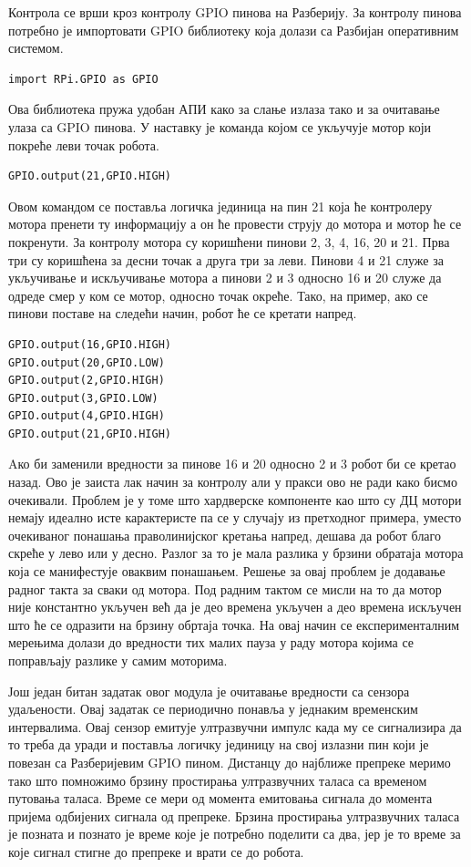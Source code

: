 \documentclass[12pt,oneside]{memoir}
\theoremstyle{remark}
\begin{document}
Контрола се врши кроз контролу GPIO пинова на Разберију. За контролу пинова потребно је импортовати GPIO библиотеку која долази са Разбијан оперативним системом.
\begin{lstlisting}
import RPi.GPIO as GPIO
\end{lstlisting}
Ова библиотека пружа удобан АПИ како за слање излаза тако и за очитавање улаза са GPIO пинова. У наставку је команда којом се укључује мотор који покреће леви точак робота.
\begin{lstlisting}
GPIO.output(21,GPIO.HIGH)
\end{lstlisting}

Овом командом се поставља логичка јединица на пин 21 која ће контролеру мотора пренети ту информацију а он ће провести струју до мотора и мотор ће се покренути.
За контролу мотора су коришћени пинови 2, 3, 4, 16, 20 и 21. Прва три су коришћена за десни точак а друга три за леви. Пинови 4 и 21 служе за укључивање и искључивање мотора а пинови 2 и 3 односно  16 и 20 служе да одреде смер у ком се мотор, односно точак окреће. Тако, на пример, ако се пинови поставе на следећи начин, робот ће се кретати напред.
\begin{lstlisting}
GPIO.output(16,GPIO.HIGH)
GPIO.output(20,GPIO.LOW)
GPIO.output(2,GPIO.HIGH)
GPIO.output(3,GPIO.LOW)
GPIO.output(4,GPIO.HIGH)
GPIO.output(21,GPIO.HIGH)
\end{lstlisting}

Aко би заменили вредности за пинове 16 и 20 односно 2 и 3 робот би се кретао назад. Ово је заиста лак начин за контролу али у пракси ово не ради како бисмо очекивали. Проблем је у томе што хардверске компоненте као што су ДЦ мотори немају идеално исте карактеристе па се у случају из претходног примера, уместо очекиваног понашања праволинијског кретања напред, дешава да робот благо скреће у лево или у десно. Разлог за то је мала разлика у брзини обратаја мотора која се манифестује оваквим понашањем. Решење за овај проблем је додавање радног такта за сваки од мотора. Под радним тактом се мисли на то да мотор није константно укључен већ да је део времена укључен а део времена искључен што ће се одразити на брзину обртаја точка. На овај начин се експерименталним мерењима долази до вредности тих малих пауза у раду мотора којима се поправљају разлике у самим моторима.

Још један битан задатак овог модула је очитавање вредности са сензора удаљености. Овај задатак се периодично понавља у једнаким временским интервалима. 
Овај сензор емитује ултразвучни импулс када му се сигнализира да то треба да уради и поставља логичку јединицу на свој излазни пин који је повезан са Разберијевим GPIO пином. Дистанцу до најближе препреке меримо тако што помножимо брзину простирања ултразвучних таласа са временом путовања таласа. Време се мери од момента емитовања сигнала до момента пријема одбијених сигнала од препреке. Брзина простирања ултразвучних таласа је позната и познато је време које је потребно поделити са два, јер је то време за које сигнал стигне до препреке и врати се до робота.
\end{document}

